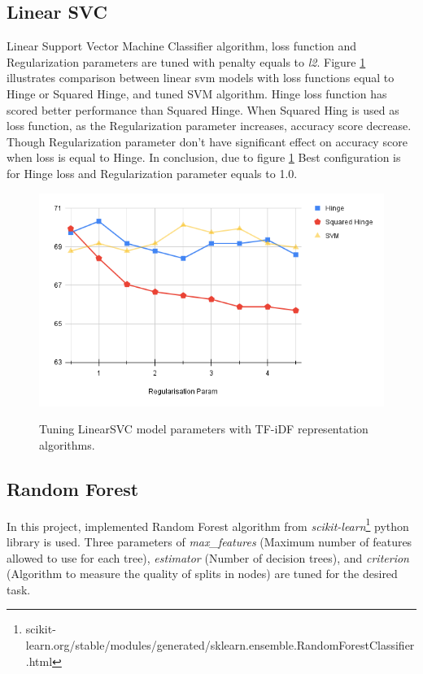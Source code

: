\subsection{Linear SVC}
Linear Support Vector Machine Classifier algorithm, loss function and Regularization parameters are tuned with penalty equals to \textit{l2}. Figure \ref{fig:linearsvm} illustrates comparison between linear svm models with loss functions equal to Hinge or Squared Hinge, and tuned SVM algorithm. Hinge loss function has scored better performance than Squared Hinge. When Squared Hing is used as loss function, as the Regularization parameter increases, accuracy score decrease. Though Regularization parameter don't have significant effect on accuracy score when loss is equal to Hinge. In conclusion, due to figure \ref{fig:linearsvm} Best configuration is for Hinge loss and Regularization parameter equals to 1.0. 
\begin{figure}%
	\centering
	{\includegraphics[width=12.5cm]{statistics/linearsvm.png} }
	\caption{Tuning LinearSVC model parameters with TF-iDF representation algorithms.}%
	\label{fig:linearsvm}%
\end{figure}
\subsection{Random Forest}
In this project, implemented Random Forest algorithm from \textit{scikit-learn}\footnote{scikit-learn.org/stable/modules/generated/sklearn.ensemble.RandomForestClassifier.html} python library is used. Three parameters of \textit{max\_features} (Maximum number of features allowed to use for each tree), \textit{estimator} (Number of decision trees), and \textit{criterion} (Algorithm to measure the quality of splits in nodes) are tuned for the desired task.


